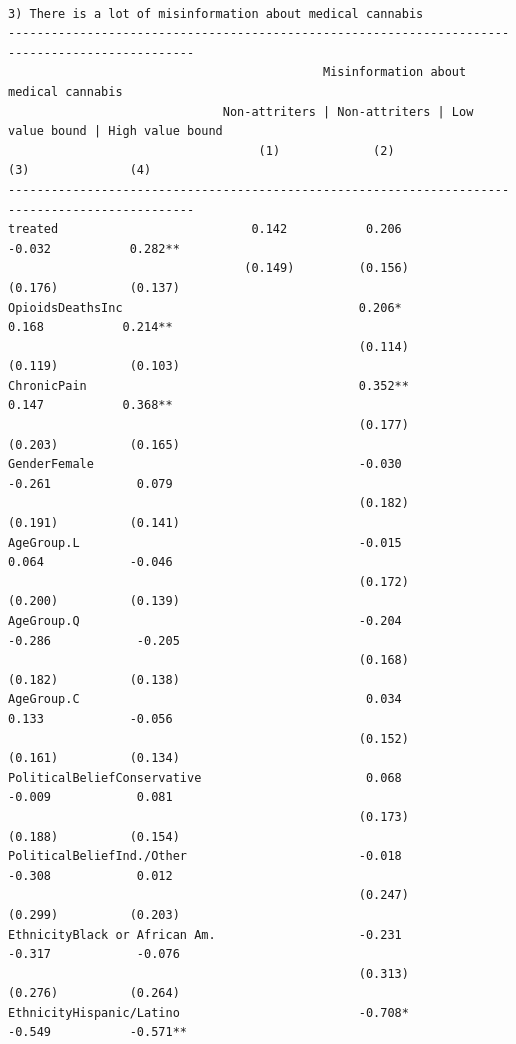 \documentclass[
]{article}
\begin{document}
\begin{verbatim}

3) There is a lot of misinformation about medical cannabis
------------------------------------------------------------------------------------------------
                                            Misinformation about medical cannabis               
                              Non-attriters | Non-attriters | Low value bound | High value bound
                                   (1)             (2)              (3)              (4)        
------------------------------------------------------------------------------------------------
treated                           0.142           0.206           -0.032           0.282**      
                                 (0.149)         (0.156)          (0.176)          (0.137)      
OpioidsDeathsInc                                 0.206*            0.168           0.214**      
                                                 (0.114)          (0.119)          (0.103)      
ChronicPain                                      0.352**           0.147           0.368**      
                                                 (0.177)          (0.203)          (0.165)      
GenderFemale                                     -0.030           -0.261            0.079       
                                                 (0.182)          (0.191)          (0.141)      
AgeGroup.L                                       -0.015            0.064            -0.046      
                                                 (0.172)          (0.200)          (0.139)      
AgeGroup.Q                                       -0.204           -0.286            -0.205      
                                                 (0.168)          (0.182)          (0.138)      
AgeGroup.C                                        0.034            0.133            -0.056      
                                                 (0.152)          (0.161)          (0.134)      
PoliticalBeliefConservative                       0.068           -0.009            0.081       
                                                 (0.173)          (0.188)          (0.154)      
PoliticalBeliefInd./Other                        -0.018           -0.308            0.012       
                                                 (0.247)          (0.299)          (0.203)      
EthnicityBlack or African Am.                    -0.231           -0.317            -0.076      
                                                 (0.313)          (0.276)          (0.264)      
EthnicityHispanic/Latino                         -0.708*          -0.549           -0.571**     

\end{verbatim}
\end{document}
